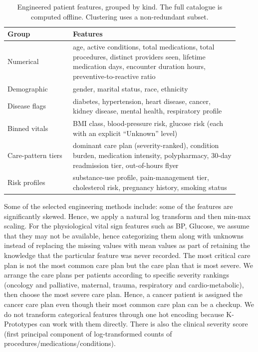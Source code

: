 \begin{table}[t]
\caption{Engineered patient features, grouped by kind. The full catalogue is computed offline. Clustering uses a non-redundant subset.}
\label{tab:features}
\centering
\footnotesize
\begin{tabular}{@{}p{0.26\linewidth}p{0.66\linewidth}@{}}
\toprule
Group & Features \\
\midrule
Numerical & age, active conditions, total medications, total procedures, distinct providers seen, lifetime medication days, encounter duration hours, preventive-to-reactive ratio \\[2pt]
Demographic & gender, marital status, race, ethnicity \\[2pt]
Disease flags & diabetes, hypertension, heart disease, cancer, kidney disease, mental health, respiratory profile \\[2pt]
Binned vitals & BMI class, blood-pressure risk, glucose risk (each with an explicit ``Unknown'' level) \\[2pt]
Care-pattern tiers & dominant care plan (severity-ranked), condition burden, medication intensity, polypharmacy, 30-day readmission tier, out-of-hours flyer \\[2pt]
Risk profiles & substance-use profile, pain-management tier, cholesterol risk, pregnancy history, smoking status \\
\bottomrule
\end{tabular}
\end{table}

Some of the selected engineering methods include: some of the features are significantly skewed. Hence, we apply a natural log transform and then min-max scaling. For the physiological vital sign features such as BP, Glucose, we assume that they may not be available, hence categorizing them along with unknowns instead of replacing the missing values with mean values as part of retaining the knowledge that the particular feature was never recorded. The most critical care plan is not the most common care plan but the care plan that is most severe. We arrange the care plans per patients according to specific severity rankings (oncology and palliative, maternal, trauma, respiratory and cardio-metabolic), then choose the most severe care plan. Hence, a cancer patient is assigned the cancer care plan even though their most common care plan can be a checkup. We do not transform categorical features through one hot encoding because K-Prototypes can work with them directly. There is also the clinical severity score (first principal component of log-transformed counts of procedures/medications/conditions).

